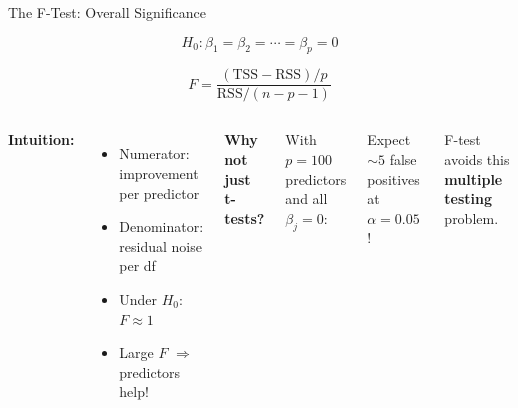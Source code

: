 \documentclass[aspectratio=169, 11pt]{beamer}
\begin{document}
\begin{frame}{The F-Test: Overall Significance}

$$H_0: \beta_1 = \beta_2 = \cdots = \beta_p = 0$$

$$F = \frac{(\text{TSS} - \text{RSS})/p}{\text{RSS}/(n - p - 1)}$$

\vspace{0.3em}
\begin{columns}
\textbf{Intuition:}
\begin{itemize}
  \item Numerator: improvement per predictor
  \item Denominator: residual noise per df
  \item Under $H_0$: $F \approx 1$
  \item Large $F$ $\Rightarrow$ predictors help!
\end{itemize}

\textbf{Why not just t-tests?}

With $p = 100$ predictors and all $\beta_j = 0$:

\vspace{0.3em}
Expect $\sim5$ false positives at $\alpha = 0.05$!

\vspace{0.3em}
F-test avoids this \textbf{multiple testing} problem.
\end{columns}
\end{frame}
\end{document}

